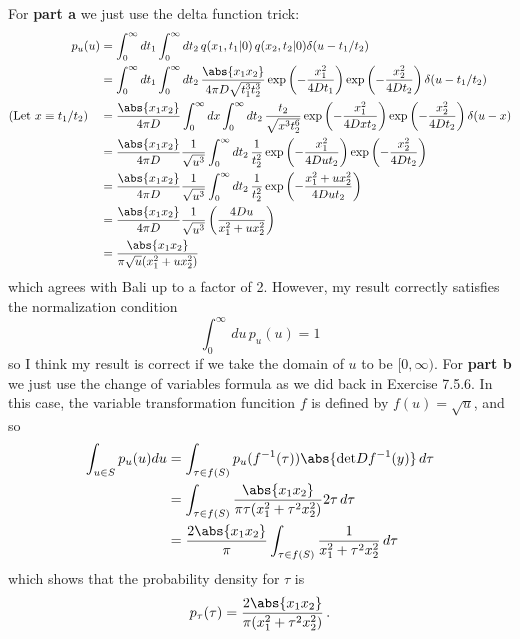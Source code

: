 For \textbf{part a} we just use the delta function trick:
\begin{align*}
  p_u(u)
  &= \int_0^\infty dt_1 \int_0^\infty dt_2 \, q(x_1, t_1 | 0) \, q(x_2, t_2 | 0)
    \delta( u - t_1 / t_2) \\
  &= \int_0^\infty dt_1 \int_0^\infty dt_2 \, \frac{\abs{x_1 x_2}}{4 \pi D \sqrt{t_1^3 t_2^3}}
    \exp \left( - \frac{x_1^2}{4 D t_1} \right)
    \exp \left( - \frac{x_2^2}{4 D t_2} \right)
    \delta( u - t_1 / t_2) \\
  \text{(Let $x \equiv t_1 / t_2$)} \quad
  &= \frac{\abs{x_1 x_2}}{4 \pi D}
    \int_0^\infty dx \int_0^\infty dt_2 \, \frac{t_2}{\sqrt{x^3 t_2^6}}
    \exp \left( - \frac{x_1^2}{4 D x t_2} \right)
    \exp \left( - \frac{x_2^2}{4 D t_2} \right)
    \delta(u - x) \\
  &= \frac{\abs{x_1 x_2}}{4 \pi D} \frac{1}{\sqrt{u^3}}
    \int_0^\infty dt_2 \, \frac{1}{t_2^2}
    \exp \left( - \frac{x_1^2}{4 D u t_2} \right)
    \exp \left( - \frac{x_2^2}{4 D t_2} \right)
    \\
  &= \frac{\abs{x_1 x_2}}{4 \pi D} \frac{1}{\sqrt{u^3}}
    \int_0^\infty dt_2 \, \frac{1}{t_2^2}
    \exp \left( - \frac{x_1^2 + u x_2^2}{4 D u t_2} \right)
    \\
  &= \frac{\abs{x_1 x_2}}{4 \pi D} \frac{1}{\sqrt{u^3}}
    \left( \frac{4 D u}{x_1^2 + u x_2^2} \right)
    \\
  &= \frac{\abs{x_1 x_2}}{\pi \sqrt{u} (x_1^2 + u x_2^2)}
\end{align*}
which agrees with Bali up to a factor of 2.
However, my result correctly satisfies the normalization condition
\begin{equation*}
  \int_0^\infty \, du \, p_u(u) = 1
\end{equation*}
so I think my result is correct if we take the domain of $u$ to be $[0, \infty)$.
For \textbf{part b} we just use the change of variables formula as we did back in Exercise 7.5.6.
In this case, the variable transformation funcition $f$ is defined by $f(u) = \sqrt{u}$, and so
\begin{align*}
  \int_{u \in S} p_u(u) du
  &= \int_{\tau \in f(S)} p_u(f^{-1}(\tau)) \abs{\text{det}Df^{-1}(y)} \, d\tau \\
  &= \int_{\tau \in f(S)} \frac{\abs{x_1 x_2}}{\pi \tau (x_1^2 + \tau^2 x_2^2)} 2 \tau \, d\tau \\
  &= \frac{2\abs{x_1 x_2}}{\pi} \int_{\tau \in f(S)} \frac{1}{x_1^2 + \tau^2 x_2^2} \, d\tau
\end{align*}
which shows that the probability density for $\tau$ is
\begin{equation*}
  p_\tau(\tau) = \frac{2 \abs{x_1 x_2}}{\pi (x_1^2 + \tau^2 x_2^2)}
  \, .
\end{equation*}

